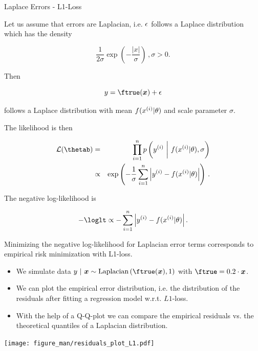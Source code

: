 \begin{vbframe}{Laplace Errors - L1-Loss}

Let us assume that errors are Laplacian, i.e. $\epsilon$ follows a Laplace distribution which has the density 

$$
 \frac{1}{2\sigma} \exp\left(-\frac{|x|}{\sigma}\right)\,, \sigma > 0.
$$ 

Then

$$
y = \ftrue(\xv) + \eps 
$$

follows a Laplace distribution with mean $f(x^{(i)} | \theta)$ and scale parameter $\sigma$. 

\framebreak 

The likelihood is then 

\begin{eqnarray*}
\LL(\thetab) &=& \prod_{i=1}^n \pdf\left(\yi ~\bigg|~ \fxit, \sigma\right) \\ &\propto& \exp\left(-\frac{1}{\sigma}\sumin \left|\yi - \fxit\right|\right)\,.
\end{eqnarray*}


The negative log-likelihood is

$$
- \loglt \propto - \sumin \left|\yi - \fxit\right|.
$$

Minimizing the negative log-likelihood for Laplacian error terms corresponds to empirical risk minimization with L1-loss. 


\framebreak 

\begin{footnotesize}
\begin{itemize}
	\item We simulate data $y ~|~\xv \sim \text{Laplacian}\left(\ftrue(\xv), 1\right)$ with $\ftrue = 0.2 \cdot \xv$. 
\item We can plot the empirical error distribution, i.e. the distribution of the residuals after fitting a regression model w.r.t. $L1$-loss.
\item With the help of a Q-Q-plot we can compare the empirical residuals vs. the theoretical quantiles of a Laplacian distribution.  
\end{itemize}
\end{footnotesize}
\texttt{[image: figure\_man/residuals\_plot\_L1.pdf]}

\end{vbframe}

